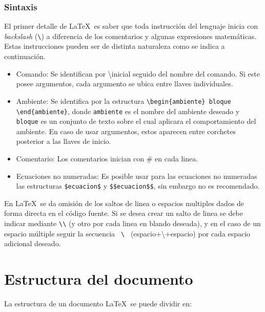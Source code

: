 \documentclass[12pt]{article}
\begin{document}
\section{Sintaxis}

El primer detalle de \LaTeX \ es saber que toda instrucción del lenguaje inicia con \textit{backslash} (\verb-\-) a diferencia de los comentarios y algunas expresiones matemáticas. Estas instrucciones pueden ser de distinta naturaleza como se indica a continuación.

\begin{itemize}
\item Comando: Se identifican por \textbackslash inicial seguido del nombre del comando. Si este posee argumentos, cada argumento se ubica entre llaves individuales.
\item Ambiente: Se identifica por la estructura \verb-\begin{ambiente} bloque \end{ambiente}-, donde \verb-ambiente- es el nombre del ambiente deseado y \verb-bloque- es un conjunto de texto sobre el cual aplicara el comportamiento del ambiente. En caso de usar argumentos, estos aparecen entre corchetes posterior a las llaves de inicio.
\item Comentario: Los comentarios inician con \# en cada linea.
\item Ecuaciones no numeradas: Es posible usar para las ecuaciones no numeradas las estructuras \verb-$ecuacion$- y \verb-$$ecuacion$$-, sin embargo no es recomendado.
\end{itemize}

En \LaTeX \ se da omisión de los saltos de linea o espacios multiples dados de forma directa en el código fuente. Si se desea crear un salto de linea se debe indicar mediante \verb-\\- (y otro por cada linea en blando deseada), y en el caso de un espacio múltiple seguir la secuencia \verb- \ - (espacio+\textbackslash +espacio) por cada espacio adicional deseado.

\part{Estructura del documento}

La estructura de un documento \LaTeX \ se puede dividir en:
\end{document}
